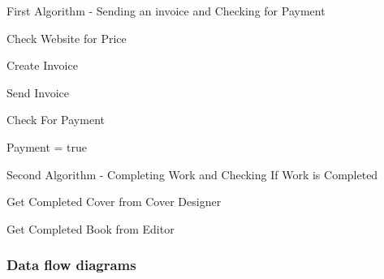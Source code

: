 \begin{algorithm}[H]
    \caption{First Algorithm - Sending an invoice and Checking for Payment}
\begin{algorithmic}[1]

\State

Check Website for Price

Create Invoice

Send Invoice


     Check For Payment


     	Payment = true

     \EndIf
\EndWhile
\end{algorithmic}
\end{algorithm}


\begin{algorithm}[H]
    \caption{Second Algorithm - Completing Work and Checking If Work is Completed}
\begin{algorithmic}[1]
\State

    
    Get Completed Cover from Cover Designer


    Get Completed Book from Editor




    \EndIf
\EndWhile
\end{algorithmic}
\end{algorithm}

\subsubsection{Data flow diagrams}

